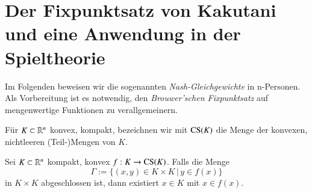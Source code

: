 \section{Der Fixpunktsatz von Kakutani und eine Anwendung in der Spieltheorie}

Im Folgenden beweisen wir die sogenannten \textit{Nash-Gleichgewichte} in n-Personen.
Als Vorbereitung ist es notwendig, den \textit{Brouwer'schen Fixpunktsatz} auf mengenwertige Funktionen
zu verallgemeinern.

Für $K\subset \mathbb{R}^n$ konvex, kompakt, bezeichnen wir mit $\mathrm{CS}(K)$ die Menge der konvexen, nichtleeren
(Teil-)Mengen von $K$.

\begin{theorem}[Kakutani]\label{2.16}
    Sei $K\subset \mathbb{R}^n$ kompakt, konvex $f:K\rightarrow \mathrm{CS}(K)$. Falls die Menge
    \[
        \Gamma := \{(x,y)\in K\times K\, |\, y\in f(x)\}
    \]
    in $K\times K$ abgeschlossen ist, dann existiert $x\in K$ mit $x\in f(x)$.
\end{theorem}

